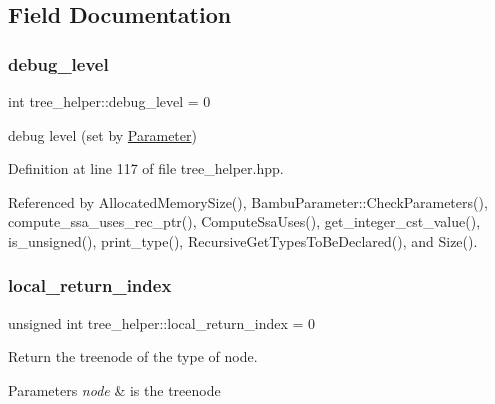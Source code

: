 \subsection{Field Documentation}
\mbox{\label{classtree__helper_a5492ea6667264979227f69dc19bcd593}} 
\subsubsection{\texorpdfstring{debug\+\_\+level}{debug\_level}}
{\footnotesize\ttfamily int tree\+\_\+helper\+::debug\+\_\+level = 0\hspace{0.3cm}{\ttfamily [static]}}



debug level (set by \hyperlink{classParameter}{Parameter}) 



Definition at line 117 of file tree\+\_\+helper.\+hpp.



Referenced by Allocated\+Memory\+Size(), Bambu\+Parameter\+::\+Check\+Parameters(), compute\+\_\+ssa\+\_\+uses\+\_\+rec\+\_\+ptr(), Compute\+Ssa\+Uses(), get\+\_\+integer\+\_\+cst\+\_\+value(), is\+\_\+unsigned(), print\+\_\+type(), Recursive\+Get\+Types\+To\+Be\+Declared(), and Size().

\mbox{\label{classtree__helper_a8b5eaad0abef101ef9c92076671efa62}} 
\subsubsection{\texorpdfstring{local\+\_\+return\+\_\+index}{local\_return\_index}}
{\footnotesize\ttfamily unsigned int tree\+\_\+helper\+::local\+\_\+return\+\_\+index = 0\hspace{0.3cm}{\ttfamily [static]}}



Return the treenode of the type of node. 


\begin{DoxyParams}{Parameters}
{\em node} & is the treenode \\
\hline
\end{DoxyParams}


